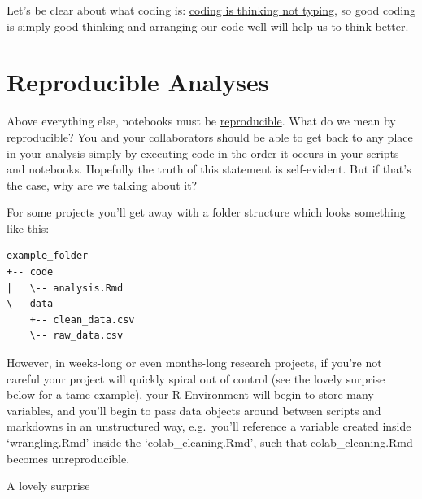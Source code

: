 \documentclass[
  letterpaper,
  DIV=11,
  numbers=noendperiod]{scrreprt}
\begin{document}
Let's be clear about what coding is:
\href{https://news.ycombinator.com/item?id=40103407\#:~:text=Programming\%20Is\%20Mostly\%20Thinking\%20(2014)\%20\%7C\%20Hacker\%20News&text=While\%20that\%20may\%20be\%20true,at\%20all\%20is\%20extremely\%20limited.}{coding
is thinking not typing}, so good coding is simply good thinking and
arranging our code well will help us to think better.

\section{Reproducible Analyses}\label{reproducible-analyses}

Above everything else, notebooks must be
\href{https://jennhuck.github.io/workshops/repro_analysis_R_RStudio.html}{reproducible}.
What do we mean by reproducible? You and your collaborators should be
able to get back to any place in your analysis simply by executing code
in the order it occurs in your scripts and notebooks. Hopefully the
truth of this statement is self-evident. But if that's the case, why are
we talking about it?

For some projects you'll get away with a folder structure which looks
something like this:

\begin{verbatim}
example_folder
+-- code
|   \-- analysis.Rmd
\-- data
    +-- clean_data.csv
    \-- raw_data.csv
\end{verbatim}

However, in weeks-long or even months-long research projects, if you're
not careful your project will quickly spiral out of control (see the
lovely surprise below for a tame example), your R Environment will begin
to store many variables, and you'll begin to pass data objects around
between scripts and markdowns in an unstructured way, e.g.~you'll
reference a variable created inside `wrangling.Rmd' inside the
`colab\_cleaning.Rmd', such that colab\_cleaning.Rmd becomes
unreproducible.

A lovely surprise
\end{document}
